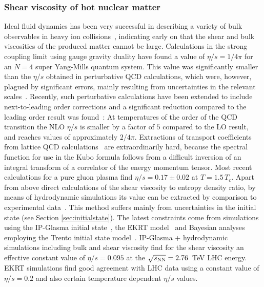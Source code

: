 \subsubsection{Shear viscosity of hot nuclear matter\label{sec:macro}}
Ideal fluid dynamics has been very successful in describing a variety of 
  bulk observables in heavy ion collisions~\cite{Kolb:2003dz,Huovinen:2003fa,Hirano:2002ds}, 
  indicating early on that the shear and bulk viscosities of the produced 
  matter cannot be large. 
Calculations in the strong coupling limit using gauge gravity duality have 
  found a value of $\eta/s=1/4\pi$ for an $N = 4$ super Yang-Mills 
  quantum system. 
This value was significantly smaller than the $\eta/s$ obtained in 
  perturbative QCD calculations, which were, however, plagued by 
  significant errors, mainly resulting from uncertainties in the 
  relevant scales~\cite{Arnold:2003zc}. 
Recently, such perturbative calculations have been extended to include 
  next-to-leading order corrections and a significant reduction compared 
  to the leading order result was found~\cite{Ghiglieri:2018dgf}: 
At temperatures of the order of the QCD transition the NLO $\eta/s$ 
  is smaller by a factor of $5$ compared to the LO result, and reaches 
  values of approximately $2/4\pi$. 
Extractions of transport coefficients from lattice QCD calculations~\cite{Nakamura:2004sy,Meyer:2007ic,Pasztor:2018yae} 
  are extraordinarily hard, because the spectral function for use in 
  the Kubo formula follows from a difficult inversion of an integral 
  transform of a correlator of the energy momentum tensor. 
Most recent calculations for a pure gluon plasma find $\eta/s=0.17\pm 0.02$ at $T=1.5\,T_c$.
Apart from above direct calculations of the shear viscosity to entropy 
  density ratio, by means of hydrodynamic simulations its value can be 
  extracted by comparison to experimental data~\cite{Gale:2013da,Heinz:2013th}. 
This method suffers mainly from uncertainties in the initial state (see Section \ref{sec:initialstate}). 
The latest constraints come from simulations using the IP-Glasma initial 
  state~\cite{Schenke:2012wb,Schenke:2012fw}, the EKRT model~\cite{Niemi:2015qia} 
  and Bayesian analyses employing the Trento initial state model~\cite{Moreland:2018gsh}. 
IP-Glasma + hydrodynamic simulations including bulk and shear viscosity 
  find for the shear viscosity an effective constant value of $\eta/s=0.095$ 
  at the $\sqrt{s_{\mathrm{NN}}}=2.76$~TeV LHC energy. %
EKRT simulations find good agreement with LHC data using a constant value 
  of $\eta/s=0.2$ and also certain temperature dependent $\eta/s$ values.

